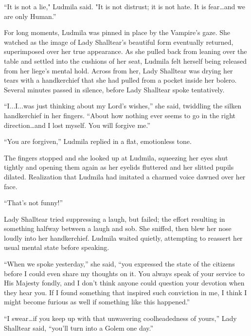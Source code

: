  

“It is not a lie," Ludmila said. "It is not distrust; it is not hate. It is fear…and we are only Human.”

 

For long moments, Ludmila was pinned in place by the Vampire’s gaze. She watched as the image of Lady Shalltear’s beautiful form eventually returned, superimposed over her true appearance. As she pulled back from leaning over the table and settled into the cushions of her seat, Ludmila felt herself being released from her liege’s mental hold. Across from her, Lady Shalltear was drying her tears with a handkerchief that she had pulled from a pocket inside her bolero. Several minutes passed in silence, before Lady Shalltear spoke tentatively.

 

“I...I...was just thinking about my Lord’s wishes,” she said, twiddling the silken handkerchief in her fingers. “About how nothing ever seems to go in the right direction…and I lost myself. You will forgive me.”

 

“You are forgiven,” Ludmila replied in a flat, emotionless tone.

 

The fingers stopped and she looked up at Ludmila, squeezing her eyes shut tightly and opening them again as her eyelids fluttered and her slitted pupils dilated. Realization that Ludmila had imitated a charmed voice dawned over her face.

 

“That’s not funny!”

 

Lady Shalltear tried suppressing a laugh, but failed; the effort resulting in something halfway between a laugh and sob. She sniffed, then blew her nose loudly into her handkerchief. Ludmila waited quietly, attempting to reassert her usual mental state before speaking.

 

“When we spoke yesterday,” she said, “you expressed the state of the citizens before I could even share my thoughts on it. You always speak of your service to His Majesty fondly, and I don’t think anyone could question your devotion when they hear you. If I found something that inspired such conviction in me, I think I might become furious as well if something like this happened.”

 

“I swear…if you keep up with that unwavering coolheadedness of yours,” Lady Shalltear said, “you’ll turn into a Golem one day.”

